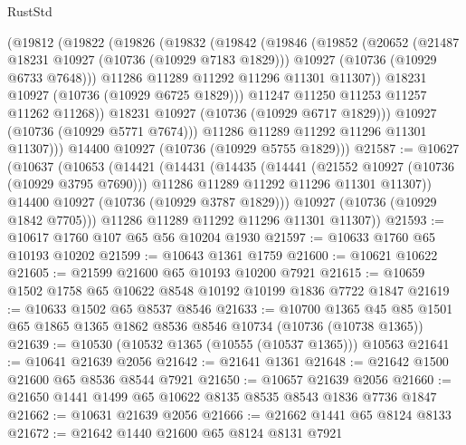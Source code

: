 \begin{lexlean}{RustStd}
\begin{coremodule}
            (@19812
              (@19822
                (@19826
                  (@19832
                    (@19842
                      (@19846
                        (@19852
                          (@20652
                            (@21487 @18231 @10927 (@10736 (@10929 @7183 @1829)))
                            @10927
                            (@10736 (@10929 @6733 @7648)))
                          @11286
                          @11289
                          @11292
                          @11296
                          @11301
                          @11307))
                      @18231
                      @10927
                      (@10736 (@10929 @6725 @1829)))
                    @11247
                    @11250
                    @11253
                    @11257
                    @11262
                    @11268))
                @18231
                @10927
                (@10736 (@10929 @6717 @1829)))
              @10927
              (@10736 (@10929 @5771 @7674)))
            @11286
            @11289
            @11292
            @11296
            @11301
            @11307)))
      @14400
      @10927
      (@10736 (@10929 @5755 @1829)))
@21587 := @10627
    (@10637
      (@10653
        (@14421
          (@14431
            (@14435
              (@14441
                (@21552 @10927 (@10736 (@10929 @3795 @7690)))
                @11286
                @11289
                @11292
                @11296
                @11301
                @11307))
            @14400
            @10927
            (@10736 (@10929 @3787 @1829)))
          @10927
          (@10736 (@10929 @1842 @7705)))
        @11286
        @11289
        @11292
        @11296
        @11301
        @11307))
@21593 := @10617 @1760 @107 @65 @56 @10204 @1930
@21597 := @10633 @1760 @65 @10193 @10202
@21599 := @10643 @1361 @1759
@21600 := @10621 @10622
@21605 := @21599 @21600 @65 @10193 @10200 @7921
@21615 := @10659 @1502 @1758 @65 @10622 @8548 @10192 @10199 @1836 @7722 @1847
@21619 := @10633 @1502 @65 @8537 @8546
@21633 := @10700
    @1365
    @45
    @85
    @1501
    @65
    @1865
    @1365
    @1862
    @8536
    @8546
    @10734
    (@10736 (@10738 @1365))
@21639 := @10530 (@10532 @1365 (@10555 (@10537 @1365))) @10563
@21641 := @10641 @21639 @2056
@21642 := @21641 @1361
@21648 := @21642 @1500 @21600 @65 @8536 @8544 @7921
@21650 := @10657 @21639 @2056
@21660 := @21650 @1441 @1499 @65 @10622 @8135 @8535 @8543 @1836 @7736 @1847
@21662 := @10631 @21639 @2056
@21666 := @21662 @1441 @65 @8124 @8133
@21672 := @21642 @1440 @21600 @65 @8124 @8131 @7921

\end{coremodule}
\end{lexlean}
